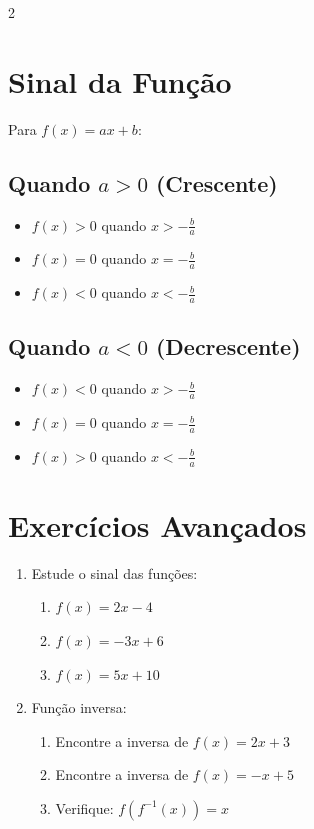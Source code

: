 \documentclass[11pt]{article}
\begin{document}
\begin{multicols}{2}
\begin{enumerate}[leftmargin=*, start=5]
\end{enumerate}

\section*{Sinal da Função}

Para $f(x) = ax + b$:

\subsection*{Quando $a > 0$ (Crescente)}
\begin{itemize}
\item $f(x) > 0$ quando $x > -\frac{b}{a}$
\item $f(x) = 0$ quando $x = -\frac{b}{a}$
\item $f(x) < 0$ quando $x < -\frac{b}{a}$
\end{itemize}

\subsection*{Quando $a < 0$ (Decrescente)}
\begin{itemize}
\item $f(x) < 0$ quando $x > -\frac{b}{a}$
\item $f(x) = 0$ quando $x = -\frac{b}{a}$
\item $f(x) > 0$ quando $x < -\frac{b}{a}$
\end{itemize}

\section*{Exercícios Avançados}

\begin{enumerate}[leftmargin=*, start=8]

\item Estude o sinal das funções:
\begin{enumerate}[label=\alph*)]
\item $f(x) = 2x - 4$
\item $f(x) = -3x + 6$
\item $f(x) = 5x + 10$
\end{enumerate}

\item Função inversa:
\begin{enumerate}[label=\alph*)]
\item Encontre a inversa de $f(x) = 2x + 3$
\item Encontre a inversa de $f(x) = -x + 5$
\item Verifique: $f(f^{-1}(x)) = x$
\end{enumerate}


\end{enumerate}
\end{multicols}
\end{document}
